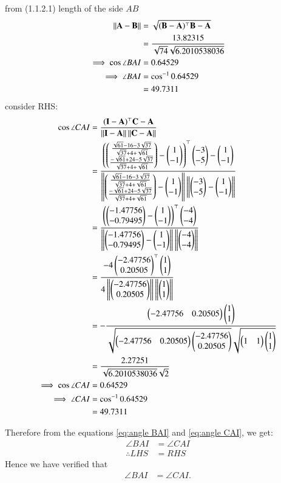\documentclass[journal,12pt,twocolumn]{IEEEtran}
\theoremstyle{remark}
\begin{document}
from (1.1.2.1) length of the side $AB$
\begin{align}
\left\lVert\mathbf{A} - \mathbf{B}\right\rVert &= \sqrt{(\mathbf{B}-\mathbf{A}){^\top}\mathbf{B}-\mathbf{A}}\\
&= \frac{13.82315}{\sqrt{74}\sqrt{6.2010538036}}\\
\implies \cos{\angle BAI} &= 0.64529 \\
\implies \angle BAI &= \cos^{-1}{0.64529}\\
&= 49.7311 \label{eq:angle BAI}
\end{align}
consider RHS:
\begin{align}
\cos{\angle CAI} &= \frac{(\mathbf{I} - \mathbf{A})^{\top}\mathbf{C} - \mathbf{A}}{\left\lVert\mathbf{I} - \mathbf{A}\right\rVert \left\lVert \mathbf{C} - \mathbf{A}\right\rVert}\\
&= \frac{\left(\begin{pmatrix}\frac{{\sqrt{61}-16-3\sqrt{37}}}{\sqrt{37}+4+\sqrt{61}}\\\frac{{-\sqrt{61}+24-5\sqrt{37}}}{\sqrt{37}+4+\sqrt{61}}\end{pmatrix} - \begin{pmatrix}1\\-1\end{pmatrix}\right)^{\top}\begin{pmatrix}-3\\-5\end{pmatrix} - \begin{pmatrix}1\\-1\end{pmatrix}}{\left\lVert\begin{pmatrix}\frac{{\sqrt{61}-16-3\sqrt{37}}}{\sqrt{37}+4+\sqrt{61}}\\ \frac{{-\sqrt{61}+24-5\sqrt{37}}}{\sqrt{37}+4+\sqrt{61}}\end{pmatrix} - \begin{pmatrix}1\\-1\end{pmatrix}\right\rVert \left\lVert\begin{pmatrix}-3\\-5\end{pmatrix} - \begin{pmatrix}1\\-1\end{pmatrix}\right\rVert}\\
&= \frac{\left(\begin{pmatrix}-1.47756\\-0.79495\end{pmatrix} - \begin{pmatrix}1\\-1\end{pmatrix}\right)^{\top}\begin{pmatrix}-4\\-4\end{pmatrix}}{\left\lVert\begin{pmatrix}-1.47756\\-0.79495\end{pmatrix} - \begin{pmatrix}1\\-1\end{pmatrix}\right\rVert \left\lVert \begin{pmatrix}-4\\-4\end{pmatrix}\right\rVert}\\
&= \frac{-4\begin{pmatrix}-2.47756\\0.20505\end{pmatrix}^{\top}\begin{pmatrix}1\\1\end{pmatrix}}{4\left\lVert\begin{pmatrix}-2.47756\\0.20505\end{pmatrix}\right\rVert \left\lVert \begin{pmatrix}1\\1\end{pmatrix}\right\rVert}\\
&= -\frac{\begin{pmatrix}-2.47756&0.20505\end{pmatrix}\begin{pmatrix}1\\1\end{pmatrix}}{\sqrt{\begin{pmatrix}-2.47756&0.20505\end{pmatrix}\begin{pmatrix}-2.47756\\0.20505\end{pmatrix}}\sqrt{\begin{pmatrix}1&1\end{pmatrix}\begin{pmatrix}1\\1\end{pmatrix}}}\\
&= \frac{2.27251}{\sqrt{6.2010538036}\sqrt{2}}\\
\implies \cos{\angle CAI} &= 0.64529 \\
\implies \angle CAI &= \cos^{-1}{0.64529}\\
&= 49.7311 \label{eq:angle CAI}
\end{align}

Therefore from the equations \eqref{eq:angle BAI} and \eqref{eq:angle CAI}, we get:
\begin{align}
\angle BAI &= \angle CAI\\
\therefore LHS &= RHS
\end{align}
Hence we have verified that \begin{align}\angle BAI &= \angle CAI.\end{align}
\end{document}
